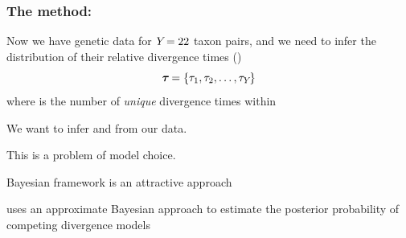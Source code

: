 \begin{frame}
    \frametitle{The method: \msb}
        Now we have genetic data for $Y_{}=22$ taxon pairs, and we need to
        infer the distribution of their relative divergence times (\divt{})
        \[
            \boldsymbol{\tau_{}} = \{\tau_{1},\tau_{2},\ldots,\tau_{Y_{}}\}
        \]
        where \numt{} is the number of \emph{unique} divergence times
        within \divtvector

        \begin{myitemize}
            \item We want to infer \numt{} and \divtvector from our data.
            \item This is a problem of model choice.
            \begin{myitemize}
                \item Bayesian framework is an attractive approach
                \item \msb uses an approximate Bayesian approach to estimate the
                    posterior probability of competing divergence models
            \end{myitemize}
        \end{myitemize}
\end{frame}


